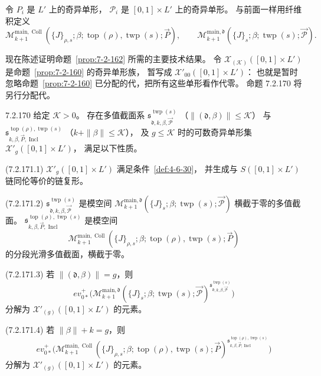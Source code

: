 令 $P_i$ 是 $L'$ 上的奇异单形，
$\mathcal P_i$ 是 $[0,1]\times L'$ 上的奇异单形。
与前面一样用纤维积定义
\[
\mathcal M_{k+1}^{\mathrm{main},\operatorname{Coll}}
(\{J\}_{\rho,s};\beta;
\operatorname{top}(\rho),\operatorname{twp}(s);\vec P),
\qquad
\mathcal M_{k+1}^{\mathrm{main},\mathfrak d}
(\{J\}_s;\beta;
\operatorname{twp}(s);\vec{\mathcal P}).
\]

现在陈述证明命题~\ref{prop:7-2-162}
所需的主要技术结果。
令 $\mathcal X_{(\mathcal K)}([0,1]\times L')$
是命题~\ref{prop:7-2-160} 的奇异单形族，
暂写成 $\mathcal X'_{00}([0,1]\times L')$：
也就是暂时忽略命题~\ref{prop:7-2-160}
已分配的代，把所有这些单形看作代零。
命题 7.2.170 将另行分配代。

\begin{proposition}{7.2.170}\label{prop:7-2-170}
给定 $\mathcal K>0$。
存在多值截面系
$\mathfrak s_{\mathfrak d,k,\beta,
\vec{\mathcal P}}^{\operatorname{twp}(s)}$
（$\|(\mathfrak d,\beta)\|\le\mathcal K$）
与
$\mathfrak s_{k,\beta,\vec P,
\operatorname{Incl}}^{
\operatorname{top}(\rho),\operatorname{twp}(s)}$
（$k+\|\beta\|\le\mathcal K$），
及 $g\le\mathcal K$ 时的可数奇异单形集
$\mathcal X'_g([0,1]\times L')$，
满足以下性质。

\noindent\textup{(7.2.171.1)}\quad
$\mathcal X'_g([0,1]\times L')$
满足条件~\ref{def:4-6-30}，
并生成与 $S([0,1]\times L')$
链同伦等价的链复形。

\noindent\textup{(7.2.171.2)}\quad
$\mathfrak s_{\mathfrak d,k,\beta,
\vec{\mathcal P}}^{\operatorname{twp}(s)}$
是模空间
$\mathcal M_{k+1}^{\mathrm{main},\mathfrak d}
(\{J\}_s;\beta;
\operatorname{twp}(s);\vec{\mathcal P})$
横截于零的多值截面。
$\mathfrak s_{k,\beta,\vec P,
\operatorname{Incl}}^{
\operatorname{top}(\rho),\operatorname{twp}(s)}$
是模空间
\[
\mathcal M_{k+1}^{\mathrm{main},\operatorname{Coll}}
(\{J\}_{\rho,s};\beta;
\operatorname{top}(\rho),\operatorname{twp}(s);\vec P)
\]
的分段光滑多值截面，横截于零。

\noindent\textup{(7.2.171.3)}\quad
若 $\|(\mathfrak d,\beta)\|=g$，则
\[
ev_{0*}^+\bigl(
\mathcal M_{k+1}^{\mathrm{main},\mathfrak d}
(\{J\}_s;\beta;
\operatorname{twp}(s);\vec{\mathcal P})^{
\mathfrak s_{\mathfrak d,k,\beta,
\vec{\mathcal P}}^{\operatorname{twp}(s)}}\bigr)
\]
分解为 $\mathcal X'_{(g)}([0,1]\times L')$ 的元素。

\noindent\textup{(7.2.171.4)}\quad
若 $\|\beta\|+k=g$，则
\[
ev_{0*}^+\bigl(
\mathcal M_{k+1}^{\mathrm{main},\operatorname{Coll}}
(\{J\}_{\rho,s};\beta;
\operatorname{top}(\rho),\operatorname{twp}(s);\vec P)^{
\mathfrak s_{k,\beta,\vec P,
\operatorname{Incl}}^{
\operatorname{top}(\rho),\operatorname{twp}(s)}}\bigr)
\]
分解为 $\mathcal X'_{(g)}([0,1]\times L')$ 的元素。


\end{proposition}
